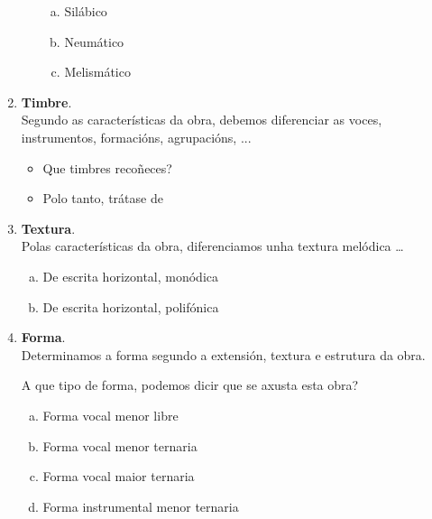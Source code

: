 \begin{multicols}{2}
\begin{enumerate}[1.-]
\begin{itemize}
                \begin{enumerate}[a)]
                  \item
                  Silábico \dotfill
                  \item
                  Neumático \dotfill
                  \item
                  Melismático \dotfill
                \end{enumerate}
        \end{itemize}
        \item %
        \textbf{Timbre}. \\
        Segundo as características da obra, debemos diferenciar as voces, instrumentos, formacións, agrupacións, ...
            \begin{itemize}
                \item 
                Que timbres recoñeces? \dotfill
                \item
                Polo tanto, trátase de \dotfill
            \end{itemize}
        \item %
        \textbf{Textura}. \\
        Polas características da obra, diferenciamos unha textura melódica \ldots 
            \begin{enumerate}[a)]
                \item 
                De escrita horizontal, monódica
                \item 
                De escrita horizontal, polifónica
            \end{enumerate}
        \item %
        \textbf{Forma}. \\
        Determinamos a forma segundo a extensión, textura e estrutura da obra. \\ 
        \par %
        A que tipo de forma, podemos dicir que se axusta esta obra?
        \begin{enumerate}[a)]
            \item 
            Forma vocal menor libre
            \item
            Forma vocal menor ternaria
            \item
            Forma vocal maior ternaria
            \item
            Forma instrumental menor ternaria
        \end{enumerate}
        \end{enumerate}
%
\end{multicols}
%
